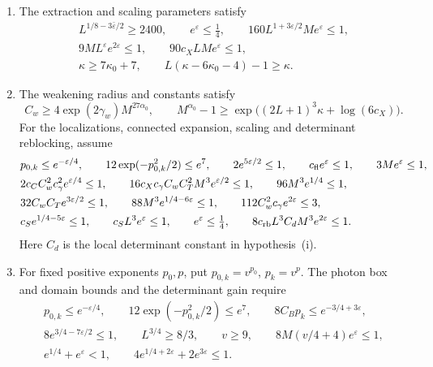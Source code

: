 \begin{theorem}
\begin{enumerate}[label=\textup{(\roman*)},leftmargin=*]
\item The extraction and scaling parameters satisfy
\begin{equation}\label{eq:nlm-normalization-hypotheses}
 \begin{gathered}
 L^{1/8-3\bar\varepsilon/2}\ge2400,\qquad e^\varepsilon\le\tfrac14,\qquad
 160L^{1+3\varepsilon/2}Me^\varepsilon\le1,\\
 9ML^\varepsilon e^{2\varepsilon}\le1,\qquad
 90c_XLMe^\varepsilon\le1,\\
 \kappa\ge7\kappa_0+7,\qquad
 L(\kappa-6\kappa_0-4)-1\ge\kappa .
 \end{gathered}
\end{equation}
\item The weakening radius and constants satisfy
\[
 C_w\ge4\exp(2\gamma_w)M^{27\alpha_0},\qquad
 M^{\alpha_0}-1\ge\exp\big((2L+1)^3\kappa+\log(6c_X)\big).
\]
For the localizations, connected expansion, scaling and determinant
reblocking, assume
\begin{align}
 &p_{0,k}\le e^{-\varepsilon/4},\qquad
       12\exp(-p_{0,k}^2/2)\le e^7,\qquad
       2e^{5\varepsilon/2}\le1,\qquad
       c_{\mathrm{fl}}e^\varepsilon\le1,\qquad3Me^\varepsilon\le1,
                                                        \notag\\
 &2c_CC_w^2c_\gamma^2e^{\varepsilon/4}\le1,\qquad
       16c_Xc_\gamma C_wC_T^2M^3e^{\varepsilon/2}\le1,\qquad
       96M^3e^{1/4}\le1,                                \notag\\
 &32C_wC_Te^{3\varepsilon/2}\le1,\qquad
       88M^3e^{1/4-6\varepsilon}\le1,\qquad
       112C_w^2c_\gamma e^{2\varepsilon}\le3,             \notag\\
 &c_Se^{1/4-5\varepsilon}\le1,\qquad
       c_SL^3e^\varepsilon\le1,\qquad e^\varepsilon\le\tfrac14,\qquad
       8c_{\mathrm{rb}}L^3C_dM^3e^{2\varepsilon}\le1.
                                      \label{eq:rgnl-fixed-smallness}
\end{align}
Here $C_d$ is the local determinant constant in hypothesis~(i).
\item For fixed positive exponents \(p_0,p\), put
\(p_{0,k}=v^{p_0}\), \(p_k=v^p\). The photon box and domain bounds
and the determinant gain require
\[
 \begin{gathered}
 p_{0,k}\le e^{-\varepsilon/4},\qquad
 12\exp(-p_{0,k}^2/2)\le e^7,\qquad
 8C_Bp_k\le e^{-3/4+3\varepsilon},\\
 8e^{3/4-7\varepsilon/2}\le1,\qquad L^{3/4}\ge8/3,\qquad
 v\ge9,\qquad 8M(v/4+4)e^\varepsilon\le1,\\
 e^{1/4}+e^\varepsilon<1,\qquad
 4e^{1/4+2\varepsilon}+2e^{3\varepsilon}\le1 .
 \end{gathered}
\]


\end{enumerate}
\end{theorem}
